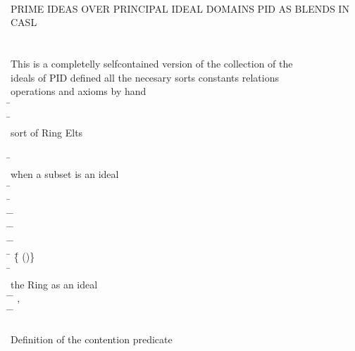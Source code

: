 \begin{hetcasl}
 \\
\\
 \\
{\small{}\KW{\%\%}PRIME IDEAS OVER PRINCIPAL IDEAL DOMAINS \Ax{(}PID\Ax{)} AS BLENDS IN CASL}\\
\\
\\
{\small{}\KW{\%\%} This is a completelly self\Ax{-}contained version of the collection of the}\\
{\small{}\KW{\%\%} ideals of PID\Ax{,} defined all the necesary sorts\Ax{,} constants\Ax{,} relations\Ax{,}}\\
{\small{}\KW{\%\%} operations and axioms by hand}\\
\SPEC \= \Ax{=}\\
\> \SORT \=\\
\>\> {\small{}\KW{\%\%} sort of Ring Elts}\\
\> \SORT {}\\
\> \PRED \= \Ax{:} \\
\>\> {\small{}\KW{\%\%} when a subset is an ideal}\\
\> \OP \= \Ax{:} \\
\> \OP \= \Ax{:} \\
\> \OP \=\Ax{\_\_}\Ax{*}\Ax{\_\_} \Ax{:} \= \Ax{\times}  \Ax{\rightarrow} \\
\> \OP \=\Ax{\_\_}\Ax{+}\Ax{\_\_} \Ax{:} \= \Ax{\times}  \Ax{\rightarrow} \\
\> \PRED \=\Ax{\_\_}\Ax{\_\_} \Ax{:} \= \Ax{\times} \\
\> \SORT \= \Ax{=} \=\{ \Ax{:}  \Ax{\bullet} ()\}\\
\> \OP \= \Ax{:} \\
\>\> {\small{}\KW{\%\%} the Ring as an ideal}\\
\> \OP \=\Ax{\_\_}\Ax{**}\Ax{\_\_} \Ax{:} \= \Ax{\times}  \Ax{\rightarrow} ,  \\
\> \PRED \=\Ax{\_\_}\Ax{\_\_} \Ax{:} \= \Ax{\times} \\
\> \\
\> {\small{}\KW{\%\%}Definition of the contention predicate}\\

\end{hetcasl}
